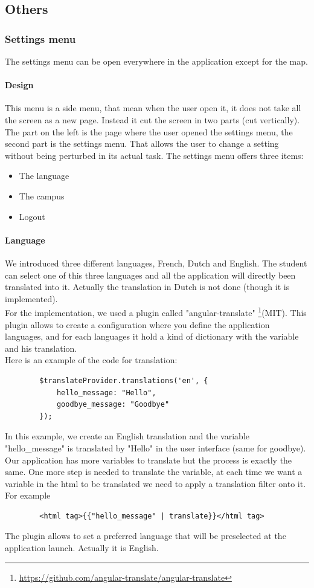 \documentclass[11pt, a4paper]{report}
\begin{document}
\subsection{Others}
\subsubsection{Settings menu}
The settings menu can be open everywhere in the application except for the map.
\paragraph{Design}
This menu is a side menu, that mean when the user open it, it does not take all the screen as a new page. Instead it cut the screen in two parts (cut vertically). The part on the left is the page where the user opened the settings menu, the second part is the settings menu. That allows the user to change a setting without being perturbed in its actual task.
The settings menu offers three items:
\begin{itemize}
\item The language
\item The campus
\item Logout
\end{itemize}
\paragraph{Language} We introduced three different languages, French, Dutch and English. The student can select one of this three languages and all the application will directly been translated into it. Actually the translation in Dutch is not done (though it is implemented). \\
For the implementation, we used a plugin called "angular-translate" \footnote{\url{https://github.com/angular-translate/angular-translate}}(MIT). This plugin allows to create a configuration where you define the application languages, and for each languages it hold a kind of dictionary with the variable and his translation.\\
Here is an example of the code for translation:
\begin{verbatim}
        $translateProvider.translations('en', {
            hello_message: "Hello",
            goodbye_message: "Goodbye"
        });
\end{verbatim}
In this example, we create an English translation and the variable "hello\_message" is translated by "Hello" in the user interface (same for goodbye). Our application has more variables to translate but the process is exactly the same. One more step is needed to translate the variable, at each time we want a variable in the html to be translated we need to apply a translation filter onto it. For example 
\begin{verbatim}
		<html tag>{{"hello_message" | translate}}</html tag> 
\end{verbatim}
The plugin allows to set a preferred language that will be preselected at the application launch. Actually it is English.
\end{document}
